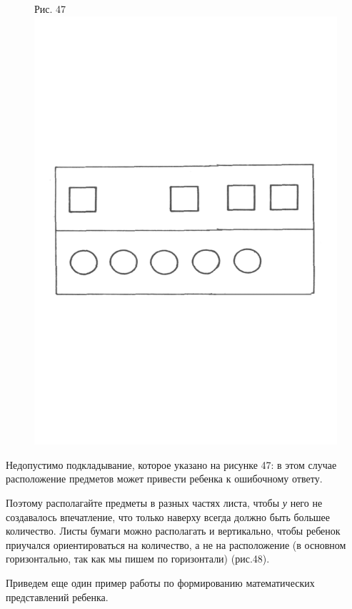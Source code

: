 \documentclass[a5paper]{book}
\renewcommand{\emph}[1]{\textit{#1}}
\begin{document}
\begin{figure}
\centering
Рис. 47\includegraphics[width=\linewidth]{media/media/image43.png}
\end{figure}

Недопустимо подкладывание, которое указано на рисунке 47: в этом случае
расположение предметов может привести ребенка к ошибочному ответу.

Поэтому располагайте предметы в разных частях листа, чтобы \emph{у} него
не создавалось впечатление, что только наверху всегда должно быть
большее количество. Листы бумаги можно располагать и вертикально, чтобы
ребенок приучался ориентироваться на количество, а не на расположение (в
основном горизонтально, так как мы пишем по горизонтали) (рис.48).

Приведем еще один пример работы по формированию математических
представлений ребенка.
\end{document}
